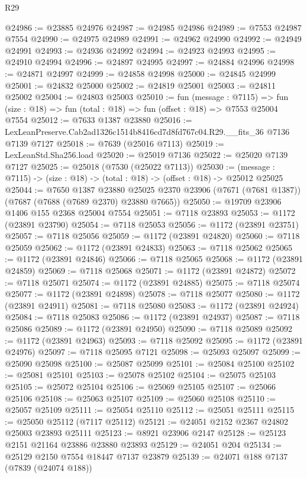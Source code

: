 \begin{lexlean}{R29}
\begin{coremodule}
@24986 := @23885 @24976
@24987 := @24985 @24986
@24989 := @7553 @24987 @7554
@24990 := @24975 @24989
@24991 := @24962 @24990
@24992 := @24949 @24991
@24993 := @24936 @24992
@24994 := @24923 @24993
@24995 := @24910 @24994
@24996 := @24897 @24995
@24997 := @24884 @24996
@24998 := @24871 @24997
@24999 := @24858 @24998
@25000 := @24845 @24999
@25001 := @24832 @25000
@25002 := @24819 @25001
@25003 := @24811 @25002
@25004 := @24803 @25003
@25010 := fun (message : @7115) =>
  fun (size : @18) => fun (total : @18) => fun (offset : @18) => @7553 @25004 @7554
@25012 := @7633 @1387 @23880
@25016 := LexLeanPreserve.Cab2ad1326c1514b8416cd7d8fd767c04.R29.__fits_36 @7136 @7139 @7127
@25018 := @7639 (@25016 @7113)
@25019 := LexLeanStd.Sha256.load
@25020 := @25019 @7136
@25022 := @25020 @7139 @7127
@25025 := @25018 (@7530 (@25022 @7113))
@25030 := (message : @7115) -> (size : @18) -> (total : @18) -> (offset : @18) -> @25012 @25025
@25044 := @7650
    @1387
    @23880
    @25025
    @2370
    @23906
    (@7671 (@7681 @1387))
    (@7687 (@7688 (@7689 @2370) @23880 @7665))
@25050 := @19709 @23906 @1406 @155 @2368 @25004 @7554
@25051 := @7118 @23893
@25053 := @1172 (@23891 @23790)
@25054 := @7118 @25053
@25056 := @1172 (@23891 @23751)
@25057 := @7118 @25056
@25059 := @1172 (@23891 @24820)
@25060 := @7118 @25059
@25062 := @1172 (@23891 @24833)
@25063 := @7118 @25062
@25065 := @1172 (@23891 @24846)
@25066 := @7118 @25065
@25068 := @1172 (@23891 @24859)
@25069 := @7118 @25068
@25071 := @1172 (@23891 @24872)
@25072 := @7118 @25071
@25074 := @1172 (@23891 @24885)
@25075 := @7118 @25074
@25077 := @1172 (@23891 @24898)
@25078 := @7118 @25077
@25080 := @1172 (@23891 @24911)
@25081 := @7118 @25080
@25083 := @1172 (@23891 @24924)
@25084 := @7118 @25083
@25086 := @1172 (@23891 @24937)
@25087 := @7118 @25086
@25089 := @1172 (@23891 @24950)
@25090 := @7118 @25089
@25092 := @1172 (@23891 @24963)
@25093 := @7118 @25092
@25095 := @1172 (@23891 @24976)
@25097 := @7118 @25095 @7121
@25098 := @25093 @25097
@25099 := @25090 @25098
@25100 := @25087 @25099
@25101 := @25084 @25100
@25102 := @25081 @25101
@25103 := @25078 @25102
@25104 := @25075 @25103
@25105 := @25072 @25104
@25106 := @25069 @25105
@25107 := @25066 @25106
@25108 := @25063 @25107
@25109 := @25060 @25108
@25110 := @25057 @25109
@25111 := @25054 @25110
@25112 := @25051 @25111
@25115 := @25050 @25112 (@7117 @25112)
@25121 := @24051 @2152 @2367 @24802 @25003 @23893 @25111
@25123 := @8921 @23906 @2147
@25128 := @25123 @2151 @21164 @23886 @23880 @23893
@25129 := @24051 @204
@25134 := @25129 @2150 @7554 @18447 @7137 @23879
@25139 := @24071 @188 @7137 (@7839 (@24074 @188))

\end{coremodule}
\end{lexlean}
